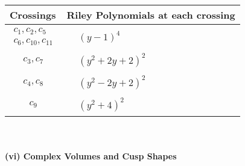 \documentclass[1p]{elsarticle_modified}
\theoremstyle{definition}
\begin{document}
\begin{tabular}{m{50pt}|m{274pt}}
Crossings & \hspace{64pt}Riley Polynomials at each crossing \\
\hline $$\begin{aligned}c_{1},c_{2},c_{5}\\c_{6},c_{10},c_{11}\end{aligned}$$&$\begin{aligned}
&(y-1)^4
\end{aligned}$\\
\hline $$\begin{aligned}c_{3},c_{7}\end{aligned}$$&$\begin{aligned}
&(y^2+2 y+2)^2
\end{aligned}$\\
\hline $$\begin{aligned}c_{4},c_{8}\end{aligned}$$&$\begin{aligned}
&(y^2-2 y+2)^2
\end{aligned}$\\
\hline $$\begin{aligned}c_{9}\end{aligned}$$&$\begin{aligned}
&(y^2+4)^2
\end{aligned}$\\
\hline
\end{tabular}\\~\\
\newpage\flushleft \textbf{(vi) Complex Volumes and Cusp Shapes}
\end{document}

